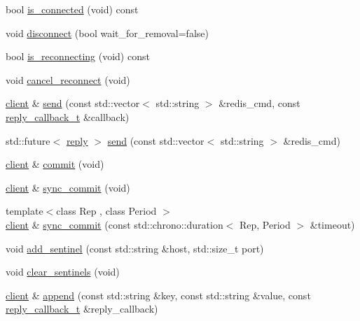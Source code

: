 \begin{DoxyCompactItemize}
\item 
bool \hyperlink{classcpp__redis_1_1client_ad3608dec2c2bfabf2c621ce14f4db37a}{is\+\_\+connected} (void) const
\item 
void \hyperlink{classcpp__redis_1_1client_a292252b61bcfdf9ad3854b54b7fe2740}{disconnect} (bool wait\+\_\+for\+\_\+removal=false)
\item 
bool \hyperlink{classcpp__redis_1_1client_af03ca1aec6416ab35e6aea93c74d89d1}{is\+\_\+reconnecting} (void) const
\item 
void \hyperlink{classcpp__redis_1_1client_adb605a877f65b8f54725576b45aeeca6}{cancel\+\_\+reconnect} (void)
\item 
\hyperlink{classcpp__redis_1_1client}{client} \& \hyperlink{classcpp__redis_1_1client_a490ef812b666e6d845fcacc808b87bc1}{send} (const std\+::vector$<$ std\+::string $>$ \&redis\+\_\+cmd, const \hyperlink{classcpp__redis_1_1client_a061a1140d36d2eaeda82b09a0bb3f9f2}{reply\+\_\+callback\+\_\+t} \&callback)
\item 
std\+::future$<$ \hyperlink{classcpp__redis_1_1reply}{reply} $>$ \hyperlink{classcpp__redis_1_1client_ad6216d6587d50694c16d68e8e182b0be}{send} (const std\+::vector$<$ std\+::string $>$ \&redis\+\_\+cmd)
\item 
\hyperlink{classcpp__redis_1_1client}{client} \& \hyperlink{classcpp__redis_1_1client_a36a48d61a4900e88fd67795ca59cbea3}{commit} (void)
\item 
\hyperlink{classcpp__redis_1_1client}{client} \& \hyperlink{classcpp__redis_1_1client_a23c8a27ee691c52713411ae91e1391fb}{sync\+\_\+commit} (void)
\item 
{\footnotesize template$<$class Rep , class Period $>$ }\\\hyperlink{classcpp__redis_1_1client}{client} \& \hyperlink{classcpp__redis_1_1client_a79a24c8367cb1229fd2c4c38d0f82533}{sync\+\_\+commit} (const std\+::chrono\+::duration$<$ Rep, Period $>$ \&timeout)
\item 
void \hyperlink{classcpp__redis_1_1client_a7050eb52856decad9ab2060a139f4b48}{add\+\_\+sentinel} (const std\+::string \&host, std\+::size\+\_\+t port)
\item 
void \hyperlink{classcpp__redis_1_1client_a68cd15d1cc30302237e3a400e2ac43f5}{clear\+\_\+sentinels} (void)
\item 
\hyperlink{classcpp__redis_1_1client}{client} \& \hyperlink{classcpp__redis_1_1client_ad60647638d8758103e98894457652b84}{append} (const std\+::string \&key, const std\+::string \&value, const \hyperlink{classcpp__redis_1_1client_a061a1140d36d2eaeda82b09a0bb3f9f2}{reply\+\_\+callback\+\_\+t} \&reply\+\_\+callback)

\end{DoxyCompactItemize}
